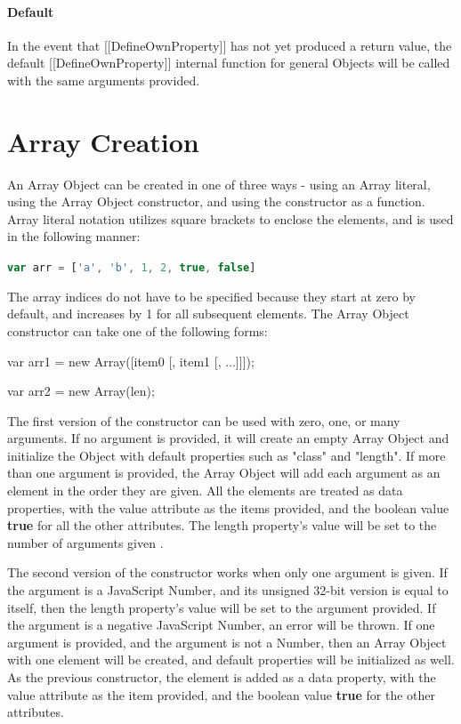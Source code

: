 \documentclass[a4paper,11pt,twoside]{report}
\def\jsinline{\lstinline[language=JavaScript, basicstyle=\small]}
\begin{document}
\paragraph{Default}
In the event that [[DefineOwnProperty]] has not yet produced a return value, the default [[DefineOwnProperty]] internal function for general Objects will be called with the same arguments provided.

\section{Array Creation}\label{sec:arraycreate}
An Array Object can be created in one of three ways - using an Array literal, using the Array Object constructor, and using the constructor as a function. Array literal notation utilizes square brackets to enclose the elements, and is used in the following manner:
\begin{center}
\jsinline|var arr = ['a', 'b', 1, 2, true, false]|
\end{center}


The array indices do not have to be specified because they start at zero by default, and increases by 1 for all subsequent elements. The Array Object constructor can take one of the following forms:

\begin{adjustwidth}{5cm}{4cm}
\begin{lstjs}
var arr1 = new Array([item0 [, item1 [, ...]]]);

var arr2 = new Array(len);
\end{lstjs}
\end{adjustwidth}

The first version of the constructor can be used with zero, one, or many arguments. If no argument is provided, it will create an empty Array Object and initialize the Object with default properties such as "class" and "length". If more than one argument is provided, the Array Object will add each argument as an element in the order they are given. All the elements are treated as data properties, with the value attribute as the items provided, and the boolean value \textbf{true} for all the other attributes. The length property's value will be set to the number of arguments given \cite{EcmaScript}.

The second version of the constructor works when only one argument is given. If the argument is a JavaScript Number, and its unsigned 32-bit version is equal to itself, then the length property's value will be set to the argument provided. If the argument is a negative JavaScript Number, an error will be thrown. If one argument is provided, and the argument is not a Number, then an Array Object with one element will be created, and default properties will be initialized as well. As the previous constructor, the element is added as a data property, with the value attribute as the item provided, and the boolean value \textbf{true} for the other attributes. 
\end{document}
